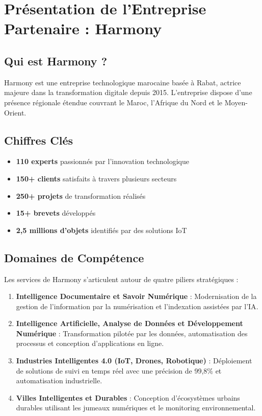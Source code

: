 \section{Présentation de l'Entreprise Partenaire : Harmony}

\subsection{Qui est Harmony ?}

\Gls{Harmony} est une entreprise technologique marocaine basée à Rabat, actrice majeure dans la transformation digitale depuis 2015. L'entreprise dispose d'une présence régionale étendue couvrant le Maroc, l'Afrique du Nord et le Moyen-Orient.

\subsection{Chiffres Clés}

\begin{itemize}
    \item \textbf{110 experts} passionnés par l'innovation technologique
    \item \textbf{150+ clients} satisfaits à travers plusieurs secteurs
    \item \textbf{250+ projets} de transformation réalisés
    \item \textbf{15+ brevets} développés
    \item \textbf{2,5 millions d'objets} identifiés par des solutions \gls{IoT}
\end{itemize}

\subsection{Domaines de Compétence}

Les services de Harmony s'articulent autour de quatre piliers stratégiques :

\begin{enumerate}
    \item \textbf{Intelligence Documentaire et Savoir Numérique} : Modernisation de la gestion de l'information par la numérisation et l'indexation assistées par l'\gls{IA}.

    \item \textbf{Intelligence Artificielle, Analyse de Données et Développement Numérique} : Transformation pilotée par les données, automatisation des processus et conception d'applications en ligne.

    \item \textbf{Industries Intelligentes 4.0 (IoT, Drones, Robotique)} : Déploiement de solutions de suivi en temps réel avec une précision de 99,8\% et automatisation industrielle.

    \item \textbf{Villes Intelligentes et Durables} : Conception d'écosystèmes urbains durables utilisant les jumeaux numériques et le monitoring environnemental.
\end{enumerate}

